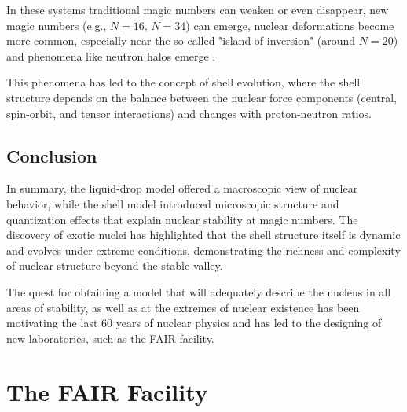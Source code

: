 

In these systems traditional magic numbers can weaken or even disappear, new magic numbers (e.g., $N=16$, $N=34$) can emerge, nuclear deformations become more common, especially near the so-called "island of inversion" (around $N=20$) and phenomena like neutron halos emerge \cite{otsuka_evolution_2020}.

This phenomena has led to the concept of shell evolution, where the shell structure depends on the balance between the nuclear force components (central, spin-orbit, and tensor interactions) and changes with proton-neutron ratios.

\subsection{Conclusion}

In summary, the liquid-drop model offered a macroscopic view of nuclear behavior, while the shell model introduced microscopic structure and quantization effects that explain nuclear stability at magic numbers. The discovery of exotic nuclei has highlighted that the shell structure itself is dynamic and evolves under extreme conditions, demonstrating the richness and complexity of nuclear structure beyond the stable valley.

The quest for obtaining a model that will adequately describe the nucleus in all areas of stability, as well as at the extremes of nuclear existence has been motivating the last 60 years of nuclear physics and has led to the designing of new laboratories, such as the FAIR facility.


\section{The FAIR Facility}


